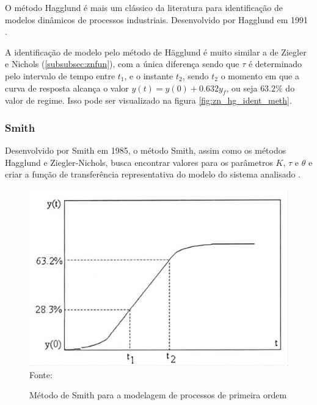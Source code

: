O método Hagglund é mais um clássico da literatura para identificação de modelos dinâmicos de
processos industriais.
Desenvolvido por Hagglund em 1991 \cite{CoelhoIdentificacao}.

A identificação de modelo pelo método de Hägglund é muito similar a de Ziegler e Nichols (\ref{subsubsec:znfun}), com a
única diferença sendo que $\tau$ é determinado pelo intervalo de tempo entre $t_1$, e o instante $t_2$, sendo $t_2$
o momento em que a curva de resposta alcança o valor $y(t) = y(0) + 0.632y_f$, ou seja $63.2\%$ do valor de regime.
Isso pode ser visualizado na figura \ref{fig:zn_hg_ident_meth}.

\subsubsection{Smith}\label{subsubsec:smfun}

Desenvolvido por Smith em 1985, o método Smith, assim como os métodos Hagglund e Ziegler-Nichols, busca encontrar
valores para os parâmetros $K$, $\tau$ e $\theta$ e criar a função de transferência representativa do modelo do sistema
analisado \cite{CoelhoIdentificacao}.

\begin{figure}[H]
    \centering
    \caption{Método de Smith para a modelagem de processos de primeira ordem}
    \includegraphics[scale=0.3]{figuras/sm_ident_meth}
    \label{fig:sm_ident_meth}
    \\
    \vspace{0cm}\hspace{0cm}\small{Fonte: \cite{CoelhoIdentificacao}}
\end{figure}

